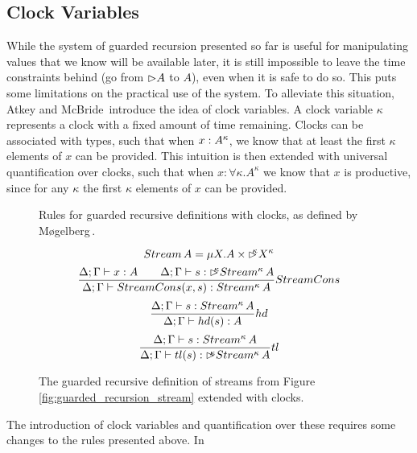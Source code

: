 \subsection{Clock Variables}
While the system of guarded recursion presented so far is useful for manipulating values that we know will be available later, it is still impossible to leave the time constraints behind (go from $\rhd A$ to $A$), even when it is safe to do so. This puts some limitations on the practical use of the system. To alleviate this situation, Atkey and McBride\,\citep{Atkey:2013} introduce the idea of clock variables. A clock variable $\kappa$ represents a clock with a fixed amount of time remaining. Clocks can be associated with types, such that when $x : A^\kappa$, we know that at least the first $\kappa$ elements of $x$ can be provided. This intuition is then extended with universal quantification over clocks, such that when $x : \forall\kappa. A^\kappa$ we know that $x$ is productive, since for any $\kappa$ the first $\kappa$ elements of $x$ can be provided. 
\begin{figure}

% 
% 
% 
% 
% 
% 
% 
\caption{Rules for guarded recursive definitions with clocks, as defined by
  M\o gelberg\,\citep{Mogelberg:2014}.}
\label{fig:guarded_recursion_rules_clocks}
\end{figure}
\begin{figure}
\[
Stream\,A = \mu X. A \times \rhd^{\!\!\!\kappa}X^\kappa
\]
\[
\frac{\Delta;\Gamma\vdash x : A \quad \quad \Delta;\Gamma\vdash s : \rhd^{\!\!\!\kappa}Stream^\kappa\,A}{\Delta;\Gamma\vdash StreamCons(x,s) : Stream^\kappa\,A} StreamCons
\]
\[
\frac{\Delta;\Gamma\vdash s : Stream^\kappa\,A}{\Delta;\Gamma\vdash hd(s) : A} hd
\]
\[
\frac{\Delta;\Gamma\vdash s : Stream^\kappa\,A}{\Delta;\Gamma\vdash tl(s) : \rhd^{\!\!\!\kappa}Stream^\kappa\,A} tl
\]
\caption{The guarded recursive definition of streams from
  Figure\,\ref{fig:guarded_recursion_stream} extended with clocks.}
\label{fig:guarded_recursion_stream_clocks}
\end{figure} 
The introduction of clock variables and quantification over these requires some
changes to the rules presented above. In
